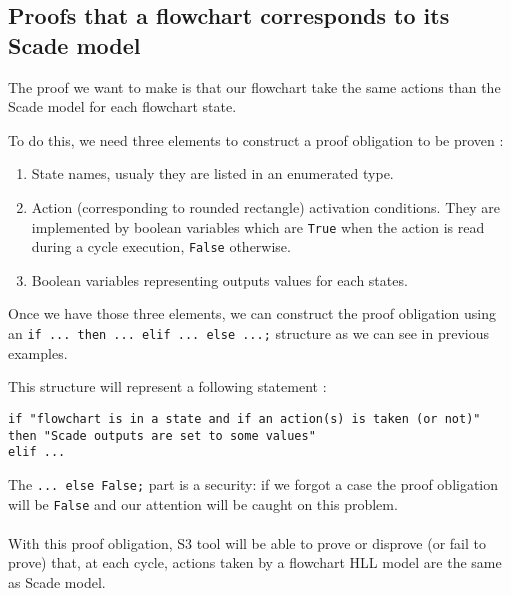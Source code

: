 \subsection{Proofs that a flowchart corresponds to its Scade model}
The proof we want to make is that our flowchart take the same actions
than the Scade model for each flowchart state.

To do this, we need three elements to construct a proof obligation to be proven :
\begin{enumerate}
\item State names, usualy they are listed in an enumerated type.
\item Action (corresponding to rounded rectangle) activation
  conditions. They are implemented by boolean variables which are
  \texttt{True} when the action is read during a cycle execution,
  \texttt{False} otherwise.
\item Boolean variables representing outputs values for each states.
\end{enumerate}

Once we have those three elements, we can construct the proof
obligation using an \texttt{if ... then ... elif ... else ...;}
structure as we can see in previous examples.

This structure will represent a following statement :
\begin{verbatim}
if "flowchart is in a state and if an action(s) is taken (or not)"
then "Scade outputs are set to some values" 
elif ...
\end{verbatim}

The \texttt{... else False;} part is a security: if we forgot a case the
proof obligation will be \texttt{False} and our attention will be
caught on this problem.

\paragraph{}
With this proof obligation, S3 tool will be able to prove or disprove
(or fail to prove) that, at each cycle, actions taken by a flowchart
HLL model are the same as Scade model.
